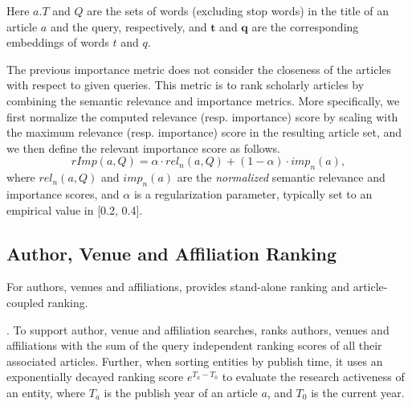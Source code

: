 Here $a.T$ and $Q$ are the sets of words (excluding stop words) in the title of an article $a$ and the query, respectively, %
and $\textbf{t}$ and $\textbf{q}$ are the corresponding embeddings of words $t$ and $q$.



 The previous importance metric does not consider the closeness of the articles with respect to given queries. This metric is to rank scholarly articles by combining the semantic relevance and importance metrics. More specifically, we first normalize the computed relevance (resp. importance) score by scaling with the maximum relevance (resp. importance) score in the resulting article set, and we then define the relevant importance score as follows.
\begin{equation}
\label{eq:relimp}
rImp(a, Q) = \alpha \cdot rel_n(a, Q) + (1-\alpha)\cdot imp_n(a),
\end{equation}
where $rel_n(a, Q)$ and $imp_n(a)$ are the {\em normalized} semantic relevance and importance scores, and $\alpha$ is a regularization parameter,
typically set to an empirical value in [0.2, 0.4].



\subsection{Author, Venue and Affiliation Ranking}
\label{subsec:heteroRanking}

For authors, venues and affiliations,  \oursystem provides stand-alone ranking and article-coupled ranking.

. To support author, venue and affiliation searches, \oursystem ranks authors, venues and affiliations with the sum of the query independent ranking scores of all their associated articles. Further, when sorting entities by publish time, it uses an exponentially decayed ranking score $e^{T_a-T_0}$ to evaluate the research activeness of an entity, where $T_a$ is the publish year of an article $a$, and $T_0$ is the current year.

